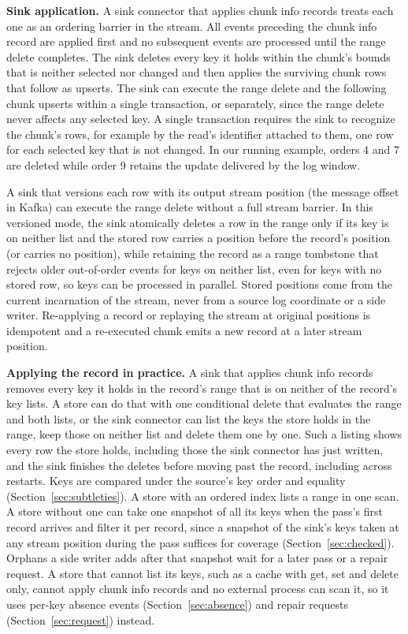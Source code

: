 \documentclass[sigconf,nonacm,10pt]{acmart}
\begin{document}
\textbf{Sink application.} A sink connector that applies chunk info records treats
each one as an ordering barrier in the stream. All
events preceding the chunk info record are applied first and no subsequent events
are processed until the range delete completes. The sink deletes every key it
holds within the chunk's bounds that is neither selected nor changed and then applies
the surviving chunk rows that follow as upserts. The sink can execute the range
delete and the following chunk upserts within a single transaction, or
separately, since the range delete never affects any selected key. A single
transaction requires the sink to recognize the chunk's rows, for example by the
read's identifier attached to them, one row for each selected key that is not
changed. In our running example, orders 4 and 7 are deleted while order 9 retains 
the update delivered by the log window.

A sink that versions each row with its output stream position (the message
offset in Kafka) can execute the range delete without a full stream barrier. In
this versioned mode, the sink atomically deletes a row in the range only if its
key is on neither list and the stored row carries a position before the
record's position (or carries no position), while retaining the record as a range tombstone that rejects older
out-of-order events for keys on neither list, even for keys with no stored row,
so keys can be processed in parallel. Stored positions come from
the current incarnation of the stream, never from a source log coordinate or a
side writer. Re-applying a record or replaying the stream at original positions
is idempotent and a re-executed chunk emits a new record at a later stream
position.

\textbf{Applying the record in practice.} A sink that applies chunk info
records removes every key it holds in the record's range that is on neither of
the record's key lists. A store can do that with one conditional delete that
evaluates the range and both lists, or the sink connector can list the keys
the store holds in the range, keep those on neither list and delete them one
by one. Such a listing shows every row the store holds, including those the
sink connector has just written, and the sink finishes the deletes before
moving past the record, including across restarts. Keys are compared under the
source's key order and equality (Section~\ref{sec:subtleties}). A store with an
ordered index lists a range in one scan. A store without one can take one snapshot of all its keys when the pass's
first record arrives and filter it per record, since a snapshot of the sink's
keys taken at any stream position during the pass suffices for coverage
(Section~\ref{sec:checked}). Orphans a side writer adds after that snapshot
wait for a later pass or a repair request. A store that cannot list its keys,
such as a cache with get, set and delete only, cannot apply chunk info records
and no external process can scan it, so it uses per-key absence events
(Section~\ref{sec:absence}) and repair requests (Section~\ref{sec:request})
instead.
\end{document}
